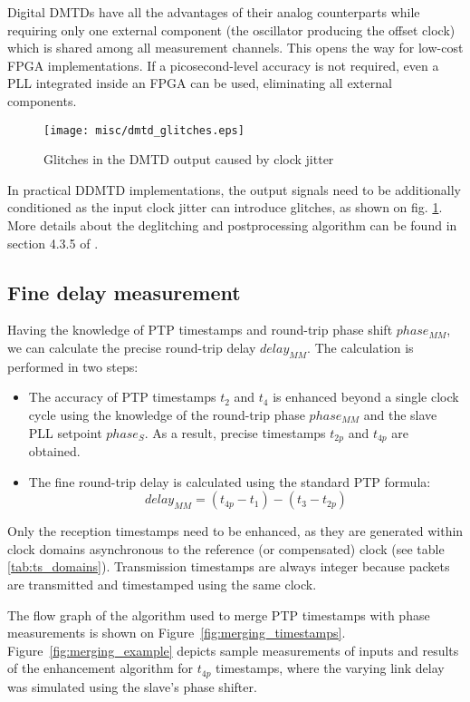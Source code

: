 Digital DMTDs have all the advantages of their analog counterparts while
requiring only one external component (the oscillator producing the offset
clock) which is shared among all measurement channels.	This opens the way
for low-cost FPGA implementations. If a picosecond-level accuracy is not
required, even a PLL integrated inside an FPGA can be used, eliminating all
external components.
\begin{figure}[ht!]
  \centering
  \texttt{[image: misc/dmtd\_glitches.eps]}
  \caption{Glitches in the DMTD output caused by clock jitter}
  \label{fig:dmtd_glitches}
\end{figure}
In practical DDMTD implementations, the output signals need to be additionally
conditioned as the input clock jitter can introduce glitches, as shown
on fig. \ref{fig:dmtd_glitches}. More details about the deglitching and
postprocessing algorithm can be found in section 4.3.5 of \cite{tomekMSC}.

\subsection{Fine delay measurement}
\label{s:fine_delay}
Having the knowledge of PTP timestamps and round-trip phase shift $phase_{MM}$,
we can calculate the precise round-trip delay $delay_{MM}$. The calculation
is performed in two steps:
\begin{itemize}
\item The accuracy of PTP timestamps $t_{2}$ and $t_{4}$ is enhanced beyond a
single clock cycle using the knowledge of the round-trip phase $phase_{MM}$
and the slave PLL setpoint $phase_{S}$. As a result, precise timestamps
$t_{2p}$ and $t_{4p}$ are obtained.
\item The fine round-trip delay is calculated using the standard PTP formula:
\begin{equation}
\label{eq:ptp_precise}
delay_{MM} = (t_{4p} - t_{1}) - (t_{3} - t_{2p})
\end{equation}
\end{itemize}

Only the reception timestamps need to be enhanced, as they are generated
within clock domains asynchronous to the reference (or compensated) clock
(see table \ref{tab:ts_domains}). Transmission timestamps are always integer
because packets are transmitted and timestamped using the same clock.

The flow graph of the algorithm used to merge PTP timestamps with
phase measurements is shown on Figure~\ref{fig:merging_timestamps}. 
Figure~\ref{fig:merging_example} depicts sample measurements of inputs and results
of the enhancement algorithm for $t_{4p}$ timestamps, where the varying link
delay was simulated using the slave's phase shifter.

